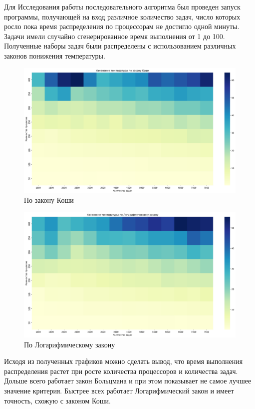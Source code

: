 \documentclass{article}
\begin{document}
Для Исследования работы последовательного алгоритма
был проведен запуск программы, получающей на вход 
различное количество задач, число которых росло пока время распределения по процессорам не достигло одной минуты. Задачи имели случайно сгенерированное время выполнения от 1 до 100. Полученные наборы задач были распределены с использованием различных законов понижения температуры.

\begin{figure}[!h]
    \centering
    \includegraphics[width=0.8\linewidth]{Cauchy.png}
    \caption{По закону Коши}
    \label{fig:enter-label}
\end{figure}

\begin{figure}[!h]
    \centering
    \includegraphics[width=0.8\linewidth]{Log-3.png}
    \caption{По Логарифмическому закону}
    \label{fig:enter-label}
\end{figure}

\newpage

Исходя из полученных графиков можно сделать вывод, что время выполнения распределения растет при росте количества процессоров и количества задач. Дольше всего работает закон Больцмана  и при этом показывает не самое лучшее значение критерия. Быстрее всех работает Логарифмический закон и имеет точность, схожую с законом Коши.
\end{document}
